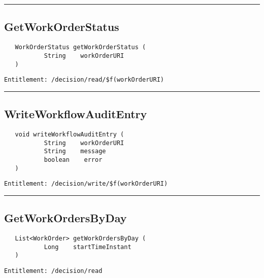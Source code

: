 \rule{12cm}{2pt}
\subsection{GetWorkOrderStatus}
\label{Api:GetWorkOrderStatus}
\begin{Verbatim}
   WorkOrderStatus getWorkOrderStatus (
           String    workOrderURI
   )
\end{Verbatim}
\begin{Verbatim}[formatcom=\color{Maroon}]
  Entitlement: /decision/read/$f(workOrderURI)
\end{Verbatim}



\rule{12cm}{2pt}
\subsection{WriteWorkflowAuditEntry}
\label{Api:WriteWorkflowAuditEntry}
\begin{Verbatim}
   void writeWorkflowAuditEntry (
           String    workOrderURI
           String    message
           boolean    error
   )
\end{Verbatim}
\begin{Verbatim}[formatcom=\color{Maroon}]
  Entitlement: /decision/write/$f(workOrderURI)
\end{Verbatim}



\rule{12cm}{2pt}
\subsection{GetWorkOrdersByDay}
\label{Api:GetWorkOrdersByDay}
\begin{Verbatim}
   List<WorkOrder> getWorkOrdersByDay (
           Long    startTimeInstant
   )
\end{Verbatim}
\begin{Verbatim}[formatcom=\color{Maroon}]
  Entitlement: /decision/read
\end{Verbatim}



